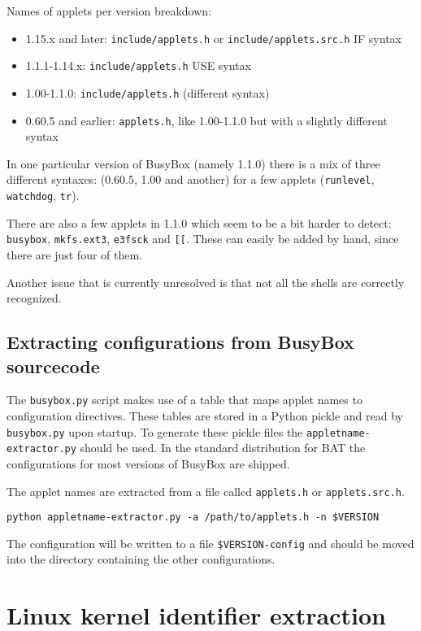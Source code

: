 \documentclass[10pt]{article}
\begin{document}
Names of applets per version breakdown:

\begin{itemize}
\item 1.15.x and later: \texttt{include/applets.h} or
\texttt{include/applets.src.h} IF syntax
\item 1.1.1-1.14.x: \texttt{include/applets.h} USE syntax
\item 1.00-1.1.0: \texttt{include/applets.h} (different syntax)
\item 0.60.5 and earlier: \texttt{applets.h}, like 1.00-1.1.0 but with a
slightly different syntax
\end{itemize}

In one particular version of BusyBox (namely 1.1.0) there is a mix of three
different syntaxes: (0.60.5, 1.00 and another) for a few applets
(\texttt{runlevel}, \texttt{watchdog}, \texttt{tr}).

There are also a few applets in 1.1.0 which seem to be a bit harder to detect:
\texttt{busybox}, \texttt{mkfs.ext3}, \texttt{e3fsck} and \texttt{[[}. These
can easily be added by hand, since there are just four of them.

Another issue that is currently unresolved is that not all the shells are
correctly recognized.

\subsection{Extracting configurations from BusyBox sourcecode}

The \texttt{busybox.py} script makes use of a table that maps applet names to
configuration directives. These tables are stored in a Python pickle and read
by \texttt{busybox.py} upon startup. To generate these pickle files the
\texttt{appletname-extractor.py} should be used. In the standard distribution
for BAT the configurations for most versions of BusyBox are shipped.

The applet names are extracted from a file called \texttt{applets.h} or
\texttt{applets.src.h}.

\begin{verbatim}
python appletname-extractor.py -a /path/to/applets.h -n $VERSION
\end{verbatim}

The configuration will be written to a file \texttt{\$VERSION-config} and
should be moved into the directory containing the other configurations.

\section{Linux kernel identifier extraction}
\end{document}

